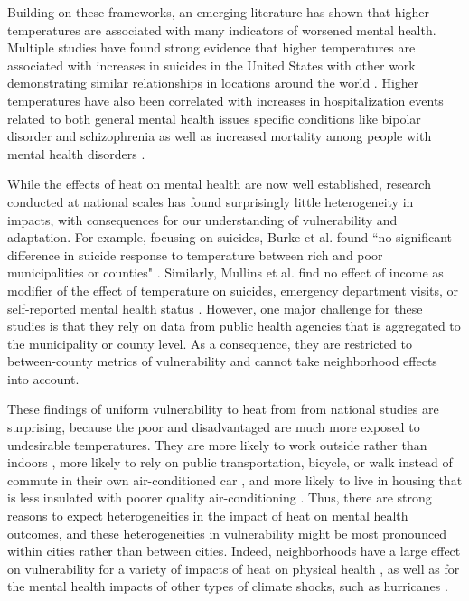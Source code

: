 \documentclass[fleqn,10pt]{wlscirep}
\begin{document}
Building on these frameworks, an emerging literature has shown that higher temperatures are associated with many indicators of worsened mental health.  Multiple studies have found strong evidence that higher temperatures are associated with increases in suicides in the United States \cite{Burke2018Aug, Mullins2019Dec, Dixon2007May} with other work demonstrating similar relationships in locations around the world \cite{Qi2014Dec, Page2007Aug, Likhvar2011Jan}.  Higher temperatures have also been correlated with increases in hospitalization events related to both general mental health issues \cite{Obradovich2018Oct, Mullins2019Dec} specific conditions like bipolar disorder and schizophrenia \cite{Lee2007Jan, Sung2013Feb} as well as increased mortality among people with mental health disorders \cite{Hansen2008Oct}.

While the effects of heat on mental health are now well established, research conducted at national scales has found surprisingly little heterogeneity in impacts, with consequences for our understanding of vulnerability and adaptation.  For example, focusing on suicides, Burke et al. found ``no significant difference in suicide response to temperature between rich and poor municipalities or counties" \cite{Burke2018Aug}.  Similarly, Mullins et al. find no effect of income as modifier of the effect of temperature on suicides, emergency department visits, or self-reported mental health status \cite{Mullins2019Dec}.  However, one major challenge for these studies is that they rely on data from public health agencies that is aggregated to the municipality or county level.  As a consequence, they are restricted to between-county metrics of vulnerability and cannot take neighborhood effects into account.

These findings of uniform vulnerability to heat from from national studies are surprising, because the poor and disadvantaged are much more exposed to undesirable temperatures.  They are more likely to work outside rather than indoors \cite{Gubernot2014Oct}, more likely to rely on public transportation, bicycle, or walk instead of commute in their own air-conditioned car \cite{Karner2015Dec}, and more likely to live in housing that is less insulated with poorer quality air-conditioning \cite{Samuelson2020Jun}.  Thus, there are strong reasons to expect heterogeneities in the impact of heat on mental health outcomes, and these heterogeneities in vulnerability might be most pronounced within cities rather than between cities.  Indeed, neighborhoods have a large effect on vulnerability for a variety of impacts of heat on physical health  \cite{Belanger2015Mar, Uejio2011Mar}, as well as for the mental health impacts of other types of climate shocks, such as hurricanes \cite{ferre2019hurricane, Gruebner2015Jun}.
\end{document}
